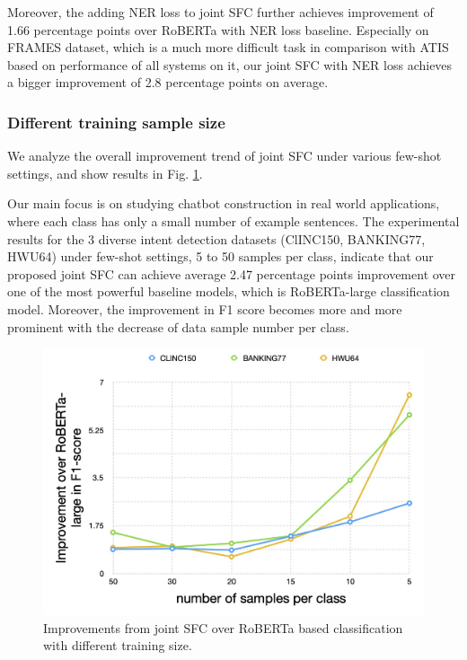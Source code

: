 Moreover, the adding NER loss to joint SFC further achieves improvement of 1.66 percentage points over RoBERTa with NER loss baseline. 
Especially on FRAMES dataset, which is a much more difficult task in comparison with ATIS based on performance of all systems on it, our joint SFC with NER loss achieves a bigger improvement of 2.8 percentage points on average. 

\subsubsection*{Different training sample size} 
We analyze the overall improvement trend of joint SFC under various few-shot settings, and show results in Fig. \ref{fig:trend}.

Our main focus is on studying chatbot construction in real world applications, where each class has only a small number of example sentences.
The experimental results for the 3 diverse intent detection datasets (ClINC150, BANKING77, HWU64) under few-shot settings, 5 to 50 samples per class, indicate that our proposed joint SFC can achieve average 2.47 percentage points improvement over one of the most powerful baseline models, which is RoBERTa-large classification model. 
Moreover, the improvement in F1 score becomes more and more prominent with the decrease of data sample number per class.

\begin{figure}[t]
  \begin{centering}
    \includegraphics[scale=0.2]{picture/improvement_trend.jpg} 
    \par
  \end{centering}
  \caption{
    Improvements from joint SFC over RoBERTa based classification with different training size.
  }
  \label{fig:trend}
\end{figure}

